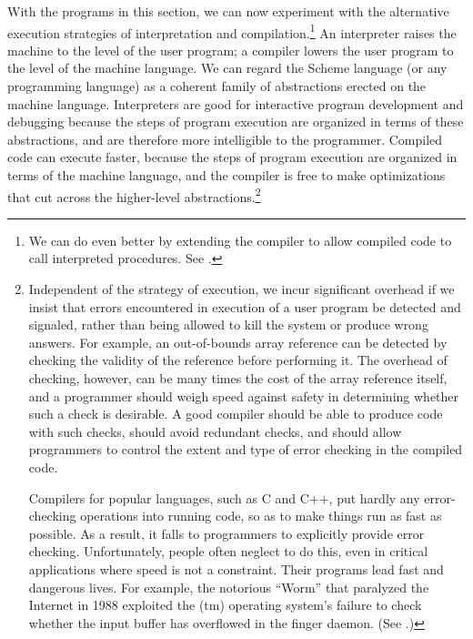 With the programs in this section, we can now experiment with the alternative
execution strategies of interpretation and compilation.\footnote{We can do even
better by extending the compiler to allow compiled code to call interpreted
procedures.  See .}  An interpreter raises the machine to
the level of the user program; a compiler lowers the user program to the level
of the machine language.  We can regard the Scheme language (or any programming
language) as a coherent family of abstractions erected on the machine language.
Interpreters are good for interactive program development and debugging because
the steps of program execution are organized in terms of these abstractions,
and are therefore more intelligible to the programmer.  Compiled code can
execute faster, because the steps of program execution are organized in terms
of the machine language, and the compiler is free to make optimizations that
cut across the higher-level abstractions.\footnote{Independent of the strategy
of execution, we incur significant overhead if we insist that errors
encountered in execution of a user program be detected and signaled, rather
than being allowed to kill the system or produce wrong answers.  For example,
an out-of-bounds array reference can be detected by checking the validity of
the reference before performing it.  The overhead of checking, however, can be
many times the cost of the array reference itself, and a programmer should
weigh speed against safety in determining whether such a check is desirable.  A
good compiler should be able to produce code with such checks, should avoid
redundant checks, and should allow programmers to control the extent and type
of error checking in the compiled code.

Compilers for popular languages, such as C and C++, put hardly any
error-checking operations into running code, so as to make things run as fast
as possible.  As a result, it falls to programmers to explicitly provide error
checking.  Unfortunately, people often neglect to do this, even in critical
applications where speed is not a constraint.  Their programs lead fast and
dangerous lives.  For example, the notorious ``Worm'' that paralyzed the
Internet in 1988 exploited the (tm) operating system's failure to
check whether the input buffer has overflowed in the finger daemon. (See
.)}

